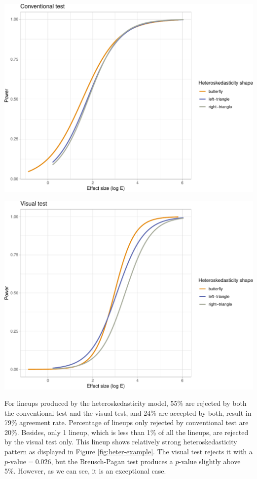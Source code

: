 \documentclass[]{interact}
\theoremstyle{plain}%
\theoremstyle{definition}
\theoremstyle{remark}
\begin{document}
\begin{center}\includegraphics[width=1\linewidth]{paper_comparison_files/figure-latex/unnamed-chunk-12-1} \end{center}

\begin{center}\includegraphics[width=1\linewidth]{paper_comparison_files/figure-latex/unnamed-chunk-13-1} \end{center}

For lineups produced by the heteroskedasticity model, 55\% are rejected
by both the conventional test and the visual test, and 24\% are accepted
by both, result in 79\% agreement rate. Percentage of lineups only
rejected by conventional test are 20\%. Besides, only 1 lineup, which is
less than 1\% of all the lineups, are rejected by the visual test only.
This lineup shows relatively strong heteroskedasticity pattern as
displayed in Figure \ref{fig:heter-example}. The visual test rejects it
with a \(p\text{-value} = 0.026\), but the Breusch-Pagan test produces a
\(p\)-value slightly above 5\%. However, as we can see, it is an
exceptional case.
\end{document}
